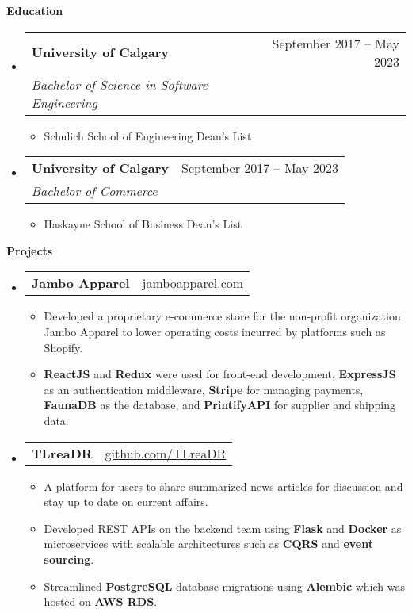 \documentclass[letterpaper,12pt]{article}[leftmargin=*]
\makeatletter
\def \entryspacing {-0pt}
\def \jambo {\href{http://jamboapparel.com}{jamboapparel.com}}
\def \tlreadr {\href{https://github.com/garywu2/TLreaDR}{github.com/TLreaDR}}
\renewcommand{\section}[2]{\vspace{5pt}
  \colorbox{secondary}{\color{white}\raggedbottom\normalsize\textbf{{#1}{\hspace{7pt}#2}}}
}
\newcommand{\resumeEntryStart}{\begin{itemize}[leftmargin=2.5mm]}
\newcommand{\resumeEntryEnd}{\end{itemize}\vspace{\entryspacing}}
\newcommand{\resumeItemListStart}{\begin{itemize}[leftmargin=4.5mm]}
\newcommand{\resumeItemListEnd}{\end{itemize}}
\newcommand{\resumeItem}[1]{
  \item\footnotesize{
    {#1 \vspace{-2pt}}
  }
}
\newcommand{\resumeEntryTSDL}[4]{
  \vspace{-1pt}\item[]
    \begin{tabularx}{0.97\textwidth}{X@{\hspace{60pt}}r}
      \textbf{\color{primary}#1} & {\firabook\color{accent}\small#2} \\
      \textit{\color{accent}\small#3} & \textit{\color{accent}\small#4} \\
    \end{tabularx}\vspace{-6pt}
}
\newcommand{\resumeEntryTD}[2]{
  \vspace{-1pt}\item[]
    \begin{tabularx}{0.97\textwidth}{X@{\hspace{60pt}}r}
      \textbf{\color{primary}#1} & {\firabook\color{accent}\small#2} \\
    \end{tabularx}\vspace{-6pt}
}
\makeatother
\begin{document}
\section{\faGraduationCap}{Education}

  \resumeEntryStart
    \resumeEntryTSDL
      {University of Calgary}{September 2017 -- May 2023}
      {Bachelor of Science in Software Engineering}{}
        \resumeItemListStart
            \resumeItem {Schulich School of Engineering Dean’s List}
        \resumeItemListEnd
  \resumeEntryEnd
  
  \resumeEntryStart
    \resumeEntryTSDL
      {University of Calgary}{September 2017 -- May 2023}
      {Bachelor of Commerce}{}
      \resumeItemListStart
            \resumeItem {Haskayne School of Business Dean’s List}
        \resumeItemListEnd
  \resumeEntryEnd

\section{\faFlask}{Projects}

  \resumeEntryStart
    \resumeEntryTD
      {Jambo Apparel}\jambo
    \resumeItemListStart
      \resumeItem {Developed a proprietary e-commerce store for the non-profit organization Jambo Apparel to lower operating costs
incurred by platforms such as Shopify.}
        \resumeItem {{\bf ReactJS} and {\bf Redux} were used for front-end development, {\bf ExpressJS} as an authentication middleware, {\bf Stripe} for
managing payments, {\bf FaunaDB} as the database, and {\bf PrintifyAPI} for supplier and shipping data.}
    \resumeItemListEnd
  \resumeEntryEnd

  \resumeEntryStart
    \resumeEntryTD
      {TLreaDR}\tlreadr
    \resumeItemListStart
      \resumeItem {A platform for users to share summarized news articles for discussion and stay up to date on current affairs.}
      \resumeItem {Developed REST APIs on the backend team using {\bf Flask} and {\bf Docker} as microservices with scalable architectures such
\hspace{10pt} as {\bf CQRS} and {\bf event sourcing}.}
      \resumeItem {Streamlined {\bf PostgreSQL} database migrations using {\bf Alembic} which was hosted on {\bf AWS RDS}.}
    \resumeItemListEnd
  \resumeEntryEnd
  
\end{document}
